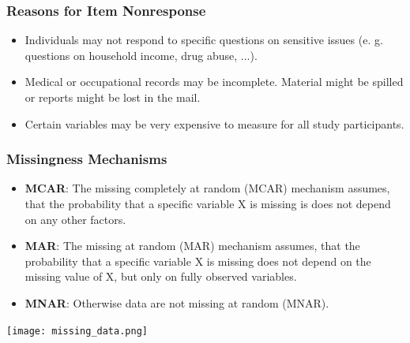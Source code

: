 \documentclass{beamer}\usepackage[]{graphicx}\usepackage[]{color}
\makeatletter
\newcommand{\hlnum}[1]{\textcolor[rgb]{0.686,0.059,0.569}{#1}}%
\newcommand{\hlstr}[1]{\textcolor[rgb]{0.192,0.494,0.8}{#1}}%
\newcommand{\hlcom}[1]{\textcolor[rgb]{0.678,0.584,0.686}{\textit{#1}}}%
\newcommand{\hlopt}[1]{\textcolor[rgb]{0,0,0}{#1}}%
\newcommand{\hlstd}[1]{\textcolor[rgb]{0.345,0.345,0.345}{#1}}%
\newcommand{\hlkwa}[1]{\textcolor[rgb]{0.161,0.373,0.58}{\textbf{#1}}}%
\newcommand{\hlkwc}[1]{\textcolor[rgb]{0.333,0.667,0.333}{#1}}%
\newcommand{\hlkwd}[1]{\textcolor[rgb]{0.737,0.353,0.396}{\textbf{#1}}}%
\newenvironment{kframe}{%
 \def\at@end@of@kframe{}%
 \ifinner\ifhmode%
  \def\at@end@of@kframe{\end{minipage}}%
  \begin{minipage}{\columnwidth}%
 \fi\fi%
 \def\FrameCommand##1{\hskip\@totalleftmargin \hskip-\fboxsep
 \colorbox{shadecolor}{##1}\hskip-\fboxsep
     \hskip-\linewidth \hskip-\@totalleftmargin \hskip\columnwidth}%
 \MakeFramed {\advance\hsize-\width
   \@totalleftmargin\z@ \linewidth\hsize
   \@setminipage}}%
 {\par\unskip\endMakeFramed%
 \at@end@of@kframe}
\newenvironment{knitrout}{}{} %
\makeatother
\begin{document}
{{{

\usebackgroundtemplate{}
\begin{frame}
\frametitle{Reasons for Item Nonresponse}
\begin{itemize}
\item Individuals may not respond to specific questions on sensitive issues
(e. g. questions on household income, drug abuse, ...).
\item Medical or occupational records may be incomplete.
Material might be spilled or reports might be lost in the mail.
\item Certain variables may be very expensive to measure for all study
participants.
\end{itemize}
\end{frame}

\usebackgroundtemplate{}
\begin{frame}
\frametitle{Missingness Mechanisms}
\begin{itemize}
\item \textbf{MCAR}: The missing completely at random (MCAR) mechanism assumes, that the
probability that a specific variable X is missing is does not depend on any
other factors.
\item \textbf{MAR}: The missing at random (MAR) mechanism assumes, that the probability that
a specific variable X is missing does not depend on the missing value of X,
but only on fully observed variables.
\item \textbf{MNAR}: Otherwise data are not missing at random (MNAR).
\end{itemize}
\begin{center}
\texttt{[image: missing\_data.png]}
\end{center}
\end{frame}

}}}
\end{document}
